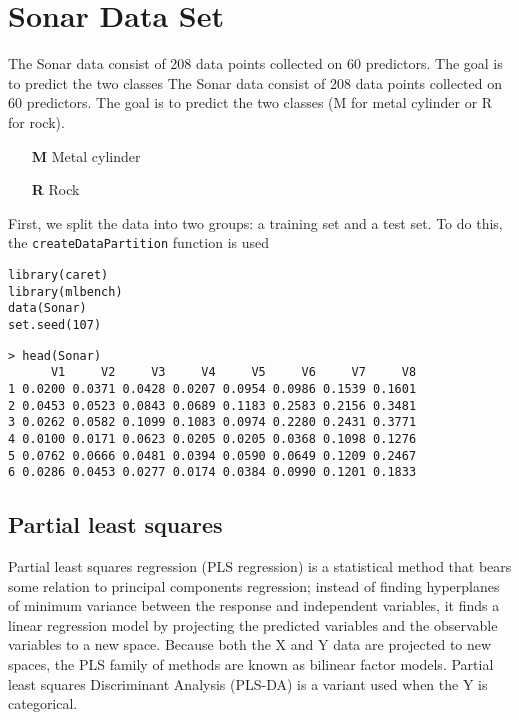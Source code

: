 \documentclass[caret-main.tex]{subfiles}
\begin{document}
\section{Sonar Data Set}
The Sonar data consist of 208 data points collected on 60 predictors. 
The goal is to predict the two classes
The Sonar data consist of 208 data points collected on 60 predictors. 
The goal is to predict the two classes (M for metal cylinder or R for rock).
\begin{itemize}
\item[\textbf{M}] Metal cylinder 
\item[\textbf{R}] Rock
\end{itemize}

First, we split the data into two groups: a training set and a test set. To do this, the \texttt{createDataPartition} function is used



\begin{framed}
\begin{verbatim}
library(caret)
library(mlbench)
data(Sonar)
set.seed(107)
\end{verbatim}
\end{framed}

\begin{verbatim}
> head(Sonar)
      V1     V2     V3     V4     V5     V6     V7     V8
1 0.0200 0.0371 0.0428 0.0207 0.0954 0.0986 0.1539 0.1601
2 0.0453 0.0523 0.0843 0.0689 0.1183 0.2583 0.2156 0.3481
3 0.0262 0.0582 0.1099 0.1083 0.0974 0.2280 0.2431 0.3771
4 0.0100 0.0171 0.0623 0.0205 0.0205 0.0368 0.1098 0.1276
5 0.0762 0.0666 0.0481 0.0394 0.0590 0.0649 0.1209 0.2467
6 0.0286 0.0453 0.0277 0.0174 0.0384 0.0990 0.1201 0.1833
\end{verbatim}
\subsection{Partial least squares}
Partial least squares regression (PLS regression) is a statistical method that bears some relation to principal components regression; instead of finding hyperplanes of minimum variance between the response and independent variables, it finds a linear regression model by projecting the predicted variables and the observable variables to a new space. Because both the X and Y data are projected to new spaces, the PLS family of methods are known as bilinear factor models. Partial least squares Discriminant Analysis (PLS-DA) is a variant used when the Y is categorical.
\end{document}
